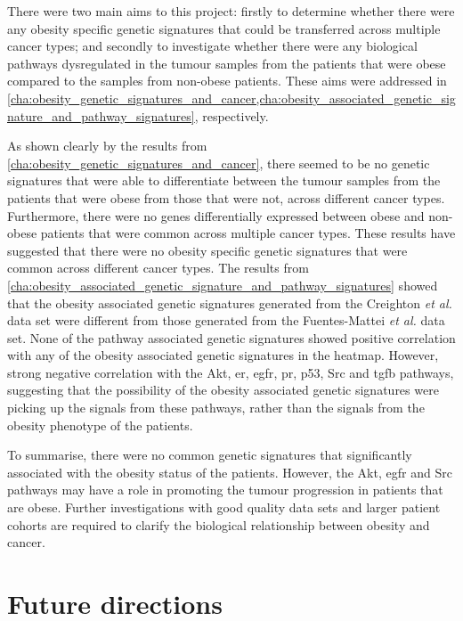 There were two main aims to this project: firstly to determine whether there were any obesity specific genetic signatures that could be transferred across multiple cancer types; and secondly to investigate whether there were any biological pathways dysregulated in the tumour samples from the patients that were obese compared to the samples from non-obese patients.
These aims were addressed in \cref{cha:obesity_genetic_signatures_and_cancer,cha:obesity_associated_genetic_signature_and_pathway_signatures}, respectively.

As shown clearly by the results from \cref{cha:obesity_genetic_signatures_and_cancer}, there seemed to be no  genetic signatures that were able to differentiate between the tumour samples from the patients that were obese from those that were not, across different cancer types.
Furthermore, there were no genes differentially expressed between obese and non-obese patients that were common across multiple cancer types.
These results have suggested that there were no obesity specific genetic signatures that were common across different cancer types.
The results from \cref{cha:obesity_associated_genetic_signature_and_pathway_signatures} showed that the obesity associated genetic signatures generated from the Creighton \textit{et al.} data set were different from those generated from the Fuentes-Mattei \textit{et al.} data set.
None of the pathway associated genetic signatures showed positive correlation with any of the obesity associated genetic signatures in the heatmap.
However, strong negative correlation with the Akt, \gls{er}, \gls{egfr}, \gls{pr}, p53, Src and \gls{tgfb} pathways, suggesting that the possibility of the obesity associated genetic signatures were picking up the signals from these pathways, rather than the signals from the obesity phenotype of the patients.

To summarise, there were no common genetic signatures that significantly associated with the obesity status of the patients.
However, the Akt, \gls{egfr} and Src pathways may have a role in promoting the tumour progression in patients that are obese.
Further investigations with good quality data sets and larger patient cohorts are required to clarify the biological relationship between obesity and cancer.

\section{Future directions}
\label{sec:future_directions}

